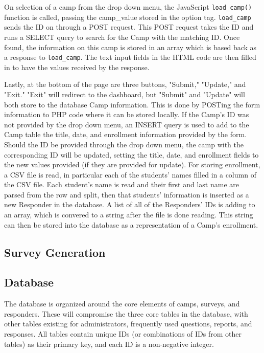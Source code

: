 \documentclass[letterpaper,10pt,serif,draftclsnofoot,onecolumn,compsoc,titlepage]{IEEEtran}
\begin{document}
On selection of a camp from the drop down menu, the JavaScript \texttt{load\_camp()} function is called, passing the camp\_value stored in the option tag.
\texttt{load\_camp} sends the ID on through a POST request.
This POST request takes the ID and runs a SELECT query to search for the Camp with the matching ID.
Once found,  the information on this camp is stored in an array which is based back as a response to \texttt{load\_camp}.
The text input fields in the HTML code are then filled in to have the values received by the response.

Lastly, at the bottom of the page are three buttons, "Submit," "Update," and "Exit."
"Exit" will redirect to the dashboard, but "Submit" and "Update" will both store to the database Camp information.
This is done by POSTing the form information to PHP code where it can be stored locally.
If the Camp's ID was not provided by the drop down menu, an INSERT query is used to add to the Camp table the title, date, and enrollment information provided by the form.
Should the ID be provided through the drop down menu, the camp with the corresponding ID will be updated, setting the title, date, and enrollment fields to the new values provided (if they are provided for update).
For storing enrollment, a CSV file is read, in particular each of the students' names filled in a column of the CSV file.
Each student's name is read and their first and last name are parsed from the row and split, then that students' information is inserted as a new Responder in the database.
A list of all of the Responders' IDs is adding to an array, which is convered to a string after the file is done reading.
This string can then be stored into the database as a representation of a Camp's enrollment.
\subsection{Survey Generation}

\subsection{Database}
The database is organized around the core elements of camps, surveys, and responders.
These will compromise the three core tables in the database, with other tables existing for administrators, frequently used questions, reports, and responses.
All tables contain unique IDs (or combinations of IDs from other tables) as their primary key, and each ID is a non-negative integer.
\end{document}
